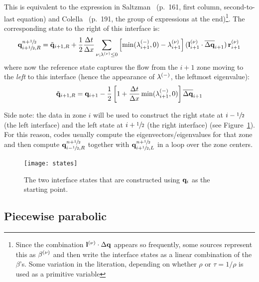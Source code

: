 This is equivalent to the expression in Saltzman~\cite{saltzman:1994}
(p.\ 161, first column, second-to-last equation) and
Colella~\cite{colella:1990} (p.\ 191, the group of expressions at the
end)\footnote{Since the combination ${\bf l}^{(\nu)} \cdot \Delta {\bf q}$
  appears so frequently, some sources represent this as $\beta^{(\nu)}$
  and then write the interface states as a linear combination of the
  $\beta$'s.  Some variation in the literation, depending on whether $\rho$
  or $\tau = 1/\rho$ is used as a primitive variable}.  The corresponding
  state to the right of this interface is:
\begin{equation}
{\bf q}_{i+{\sfrac{1}{2}},R}^{n+{\sfrac{1}{2}}} = \tilde{{\bf q}}_{i+1,R} + \frac{1}{2} \frac{\Delta t}{\Delta x}
       \sum_{\nu; \lambda^{(\nu)} \le 0}
       \left [ \min(\lambda_{i+1}^{(-)},0) - \lambda_{i+1}^{(\nu)} \right ]
       ({\bf l}_{i+1}^{(\nu)} \cdot \overline{\Delta {\bf q}}_{i+1}) \, {\bf r}_{i+1}^{(\nu)}
\end{equation}
where now the reference state captures the flow from the $i+1$ zone
moving to the {\em left} to this interface (hence the appearance of
$\lambda^{(-)}$, the leftmost eigenvalue):
\begin{equation}
\tilde{{\bf q}}_{i+1,R} = {\bf q}_{i+1} - \frac{1}{2} \left [ 1 + \frac{\Delta t}{\Delta x} \min(\lambda_{i+1}^{(-)},0) \right ] \overline{\Delta {\bf q}}_{i+1}
\end{equation}

Side note: the data in zone $i$ will be used to construct the right
state at $i-{\sfrac{1}{2}}$ (the left interface) and the left state at $i+{\sfrac{1}{2}}$
(the right interface) (see Figure~\ref{fig:states}).  For this reason,
codes usually compute the eigenvectors/eigenvalues for that zone and
then compute ${\bf q}_{i-{\sfrac{1}{2}},R}^{n+{\sfrac{1}{2}}}$ together with ${\bf q}_{i+{\sfrac{1}{2}},L}^{n+{\sfrac{1}{2}}}$
in a loop over the zone centers.

\begin{figure}
\centering
\texttt{[image: states]}
\caption[The two interface states derived from a cell-center quantity]{\label{fig:states} The two interface states that are constructed
using ${\bf q}_i$ as the starting point.}
\end{figure}

\subsection{Piecewise parabolic}

\label{sec:hydro:ppm}

